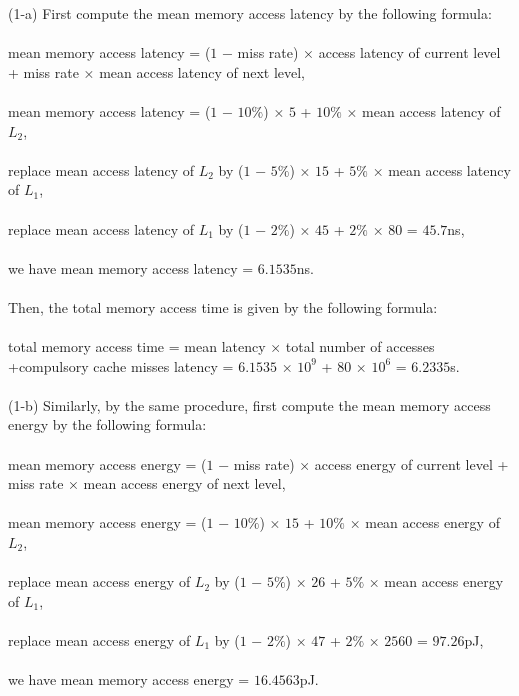 \documentclass[11pt]{article}
\begin{document}
\setcounter{page}{8}
\begin{solution}
(1-a) First compute the mean memory access latency by the following formula:
\\
\\
mean memory access latency = ($1$ $-$ miss rate) × access latency of current level
+ miss rate × mean access latency of next level,
\\
\\
mean memory access latency = ($1$ $-$ $10\%$) × $5$ + $10\%$ × mean access latency of $L_2$,
\\
\\
replace mean access latency of $L_2$ by ($1$ $-$ $5\%$) × $15$ + $5\%$ × mean access latency of $L_1$,
\\
\\
replace mean access latency of $L_1$ by ($1$ $-$ $2\%$) × $45$ + $2\%$ × $80$ = $45.7$ns,
\\
\\
we have mean memory access latency = $6.1535$ns.
\\
\\
Then, the total memory access time is given by the following formula:
\\
\\
total memory access time = mean latency × total number of accesses
+compulsory cache misses latency = $6.1535$ × $10^9$ + $80$ × $10^6$ = $6.2335$s.
\\
\\
(1-b) Similarly, by the same procedure, first compute the mean memory access energy by the following formula:
\\
\\
mean memory access energy = ($1$ $-$ miss rate) × access energy of current level
+ miss rate × mean access energy of next level,
\\
\\
mean memory access energy = ($1$ $-$ $10\%$) × $15$ + $10\%$ × mean access energy of $L_2$,
\\
\\
replace mean access energy of $L_2$ by ($1$ $-$ $5\%$) × $26$ + $5\%$ × mean access energy of $L_1$,
\\
\\
replace mean access energy of $L_1$ by ($1$ $-$ $2\%$) × $47$ + $2\%$ × $2560$ = $97.26$pJ,
\\
\\
we have mean memory access energy = $16.4563$pJ.

\end{solution}
\end{document}

